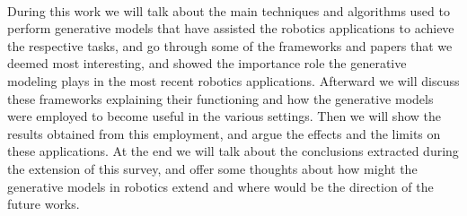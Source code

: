 \\During this work we will talk about the main techniques and algorithms used to perform generative models that have assisted the robotics applications to achieve the respective tasks, and go through some of the frameworks and papers that we deemed most interesting, and showed the importance role the generative modeling plays in the most recent robotics applications. Afterward we will discuss these frameworks explaining their functioning and how the generative models were employed to become useful in the various settings. Then we will show the results obtained from this employment, and argue the effects and the limits on these applications. At the end we will talk about the conclusions extracted during the extension of this survey, and offer some thoughts about how might the generative models in robotics extend and where would be the direction of the future works.


\clearpage{\pagestyle{empty}\cleardoublepage}
